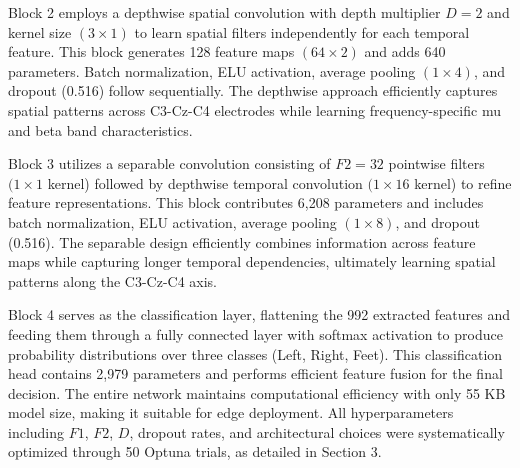 Block 2 employs a depthwise spatial convolution with depth multiplier $D=2$ and kernel size $(3 \times 1)$ to learn spatial filters independently for each temporal feature. This block generates 128 feature maps $(64 \times 2)$ and adds 640 parameters. Batch normalization, ELU activation, average pooling $(1 \times 4)$, and dropout (0.516) follow sequentially. The depthwise approach efficiently captures spatial patterns across C3-Cz-C4 electrodes while learning frequency-specific mu and beta band characteristics.

Block 3 utilizes a separable convolution consisting of $F2=32$ pointwise filters $(1 \times 1$ kernel) followed by depthwise temporal convolution $(1 \times 16$ kernel) to refine feature representations. This block contributes 6,208 parameters and includes batch normalization, ELU activation, average pooling $(1 \times 8)$, and dropout (0.516). The separable design efficiently combines information across feature maps while capturing longer temporal dependencies, ultimately learning spatial patterns along the C3-Cz-C4 axis.

Block 4 serves as the classification layer, flattening the 992 extracted features and feeding them through a fully connected layer with softmax activation to produce probability distributions over three classes (Left, Right, Feet). This classification head contains 2,979 parameters and performs efficient feature fusion for the final decision. The entire network maintains computational efficiency with only 55 KB model size, making it suitable for edge deployment. All hyperparameters including $F1$, $F2$, $D$, dropout rates, and architectural choices were systematically optimized through 50 Optuna trials, as detailed in Section 3.





